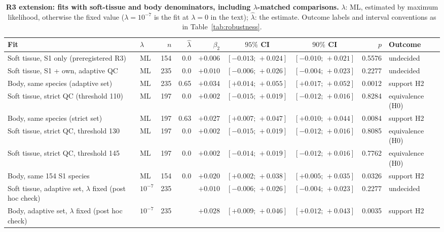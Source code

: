 \begin{table}
\centering
\caption[R3 extension: fits with soft-tissue and body denominators]{\textbf{R3 extension: fits with soft-tissue and body denominators, including $\lambda$-matched comparisons.} $\lambda$: ML, estimated by maximum likelihood, otherwise the fixed value
($\lambda = 10^{-7}$ is the fit at $\lambda = 0$ in the text); $\hat\lambda$: the estimate. Outcome labels and interval conventions as in
Table~\ref{tab:robustness}.}
\label{tab:S6}
\fontsize{7}{8}\selectfont
\setlength{\tabcolsep}{3pt}
\begin{tabular}{@{}>{\raggedright\arraybackslash}p{10.6cm}lrrrccrl@{}}
\toprule
Fit & $\lambda$ & $n$ & $\hat\lambda$ & $\beta_2$ & $95\%$ CI & $90\%$ CI & $p$ & Outcome \\
\midrule
Soft tissue, S1 only (preregistered R3) & ML & 154 & 0.0 & $+0.006$ & $[-0.013;\,+0.024]$ & $[-0.010;\,+0.021]$ & 0.5576 & undecided \\
Soft tissue, S1 + own, adaptive QC & ML & 235 & 0.0 & $+0.010$ & $[-0.006;\,+0.026]$ & $[-0.004;\,+0.023]$ & 0.2277 & undecided \\
Body, same species (adaptive set) & ML & 235 & 0.65 & $+0.034$ & $[+0.014;\,+0.055]$ & $[+0.017;\,+0.052]$ & 0.0012 & support H2 \\
Soft tissue, strict QC (threshold 110) & ML & 197 & 0.0 & $+0.002$ & $[-0.015;\,+0.019]$ & $[-0.012;\,+0.016]$ & 0.8284 & equivalence (H0) \\
Body, same species (strict set) & ML & 197 & 0.63 & $+0.027$ & $[+0.007;\,+0.047]$ & $[+0.010;\,+0.044]$ & 0.0084 & support H2 \\
Soft tissue, strict QC, threshold 130 & ML & 197 & 0.0 & $+0.002$ & $[-0.015;\,+0.019]$ & $[-0.012;\,+0.016]$ & 0.8085 & equivalence (H0) \\
Soft tissue, strict QC, threshold 145 & ML & 197 & 0.0 & $+0.002$ & $[-0.014;\,+0.019]$ & $[-0.012;\,+0.016]$ & 0.7762 & equivalence (H0) \\
Body, same 154 S1 species & ML & 154 & 0.0 & $+0.020$ & $[+0.002;\,+0.038]$ & $[+0.005;\,+0.035]$ & 0.0326 & support H2 \\
\midrule
Soft tissue, adaptive set, $\lambda$ fixed (post hoc check) & $10^{-7}$ & 235 &  & $+0.010$ & $[-0.006;\,+0.026]$ & $[-0.004;\,+0.023]$ & 0.2277 & undecided \\
Body, adaptive set, $\lambda$ fixed (post hoc check) & $10^{-7}$ & 235 &  & $+0.028$ & $[+0.009;\,+0.046]$ & $[+0.012;\,+0.043]$ & 0.0035 & support H2 \\

\end{tabular}
\end{table}
